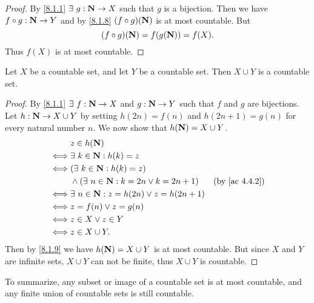 \begin{proof}
  By \cref{8.1.1} \(\exists\ g : \mathbf{N} \to X\) such that \(g\) is a bijection.
  Then we have \(f \circ g : \mathbf{N} \to Y\) and by \cref{8.1.8} \((f \circ g)(\mathbf{N})\) is at most countable.
  But
  \[
    (f \circ g)(\mathbf{N}) = f(g(\mathbf{N})) = f(X).
  \]
  Thus \(f(X)\) is at most countable.
\end{proof}

\begin{proposition}\label{8.1.10}
  Let \(X\) be a countable set, and let \(Y\) be a countable set.
  Then \(X \cup Y\) is a countable set.
\end{proposition}

\begin{proof}
  By \cref{8.1.1} \(\exists\ f : \mathbf{N} \to X\) and \(g : \mathbf{N} \to Y\) such that \(f\) and \(g\) are bijections.
  Let \(h : \mathbf{N} \to X \cup Y\) by setting \(h(2n) = f(n)\) and \(h(2n + 1) = g(n)\) for every natural number \(n\).
  We now show that \(h(\mathbf{N}) = X \cup Y\).
  \begin{align*}
         & z \in h(\N)                                                                      \\
    \iff & \exists\ k \in \N : h(k) = z                                                     \\
    \iff & (\exists\ k \in \N : h(k) = z)                                                   \\
         & \land (\exists\ n \in \N : k = 2n \lor k = 2n + 1) & \text{(by \cref{ac 4.4.2})} \\
    \iff & \exists\ n \in \N : z = h(2n) \lor z = h(2n + 1)                                 \\
    \iff & z = f(n) \lor z = g(n)                                                           \\
    \iff & z \in X \lor z \in Y                                                             \\
    \iff & z \in X \cup Y.
  \end{align*}
  Then by \cref{8.1.9} we have \(h(\mathbf{N}) = X \cup Y\) is at most countable.
  But since \(X\) and \(Y\) are infinite sets, \(X \cup Y\) can not be finite, thus \(X \cup Y\) is countable.
\end{proof}

\begin{note}
  To summarize, any subset or image of a countable set is at most countable, and any finite union of countable sets is still countable.
\end{note}

